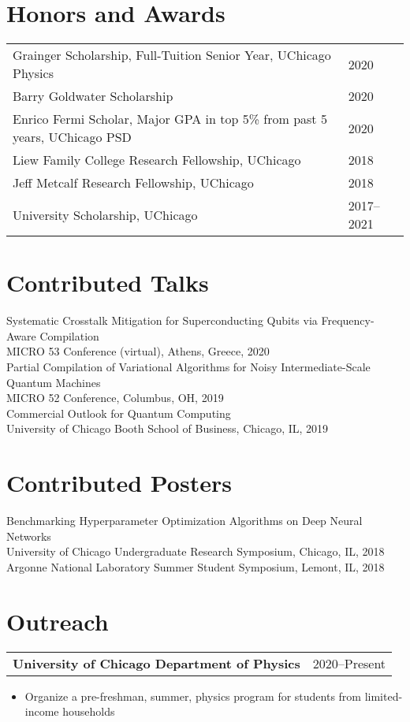 \documentclass[letterpaper, 11pt]{article}
\begin{document}
\section{Honors and Awards}
\begin{tabular}{@{} L{14.5cm} @{} R{2.01cm} @{}}
  Grainger Scholarship, Full-Tuition Senior Year, UChicago Physics & 2020\\
  Barry Goldwater Scholarship & 2020\\
  Enrico Fermi Scholar, Major GPA in top 5\% from past 5 years, UChicago PSD & 2020\\
  Liew Family College Research Fellowship, UChicago & 2018\\
  Jeff Metcalf Research Fellowship, UChicago & 2018 \\
  University Scholarship, UChicago & 2017--2021\\
\end{tabular}

\section{Contributed Talks}
Systematic Crosstalk Mitigation for Superconducting Qubits via Frequency-Aware Compilation\\
\qquad MICRO 53 Conference (virtual), Athens, Greece, 2020\\
Partial Compilation of Variational Algorithms for Noisy Intermediate-Scale Quantum Machines\\
\qquad MICRO 52 Conference, Columbus, OH, 2019\\
Commercial Outlook for Quantum Computing\\
\qquad University of Chicago Booth School of Business, Chicago, IL, 2019\\

\section{Contributed Posters}
Benchmarking Hyperparameter Optimization Algorithms on Deep Neural Networks\\
\qquad University of Chicago Undergraduate Research Symposium, Chicago, IL, 2018\\
\qquad Argonne National Laboratory Summer Student Symposium, Lemont, IL, 2018\\

\section{Outreach}
\begin{tabular}{@{} L{12cm} @{} R{4.51cm} @{}}
  \textbf{University of Chicago Department of Physics} & 2020--Present\\
\end{tabular}
\begin{itemize}
\item Organize a pre-freshman, summer, physics program for students from limited-income households
\end{itemize}
\end{document}
